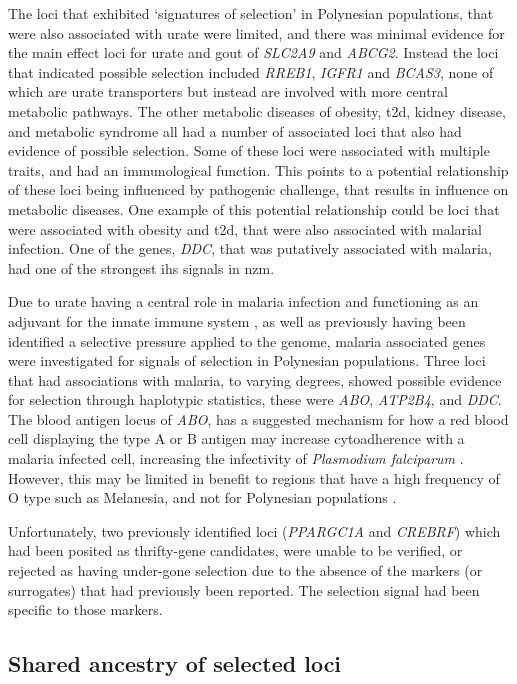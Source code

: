 \documentclass[twoside,openright]{report}
\begin{document}
The loci that exhibited `signatures of selection' in Polynesian
populations, that were also associated with urate were limited, and
there was minimal evidence for the main effect loci for urate and gout
of \emph{SLC2A9} and \emph{ABCG2}. Instead the loci that indicated
possible selection included \emph{RREB1}, \emph{IGFR1} and \emph{BCAS3},
none of which are urate transporters but instead are involved with more
central metabolic pathways. The other metabolic diseases of obesity,
\gls{t2d}, kidney disease, and metabolic syndrome all had a number of
associated loci that also had evidence of possible selection. Some of
these loci were associated with multiple traits, and had an
immunological function. This points to a potential relationship of these
loci being influenced by pathogenic challenge, that results in influence
on metabolic diseases. One example of this potential relationship could
be loci that were associated with obesity and \gls{t2d}, that were also
associated with malarial infection. One of the genes, \emph{DDC}, that
was putatively associated with malaria, had one of the strongest
\gls{ihs} signals in \gls{nzm}.

Due to urate having a central role in malaria infection and functioning
as an adjuvant for the innate immune system \citep{Ames1981, Opitz2009},
as well as previously having been identified a selective pressure
applied to the genome, malaria associated genes were investigated for
signals of selection in Polynesian populations. Three loci that had
associations with malaria, to varying degrees, showed possible evidence
for selection through haplotypic statistics, these were \emph{ABO},
\emph{ATP2B4}, and \emph{DDC}. The blood antigen locus of \emph{ABO},
has a suggested mechanism for how a red blood cell displaying the type A
or B antigen may increase cytoadherence with a malaria infected cell,
increasing the infectivity of \emph{Plasmodium falciparum}
\citep{Cserti2015}. However, this may be limited in benefit to regions
that have a high frequency of O type such as Melanesia, and not for
Polynesian populations \citep{Simmons1962, Zerihun2011}.

Unfortunately, two previously identified loci (\emph{PPARGC1A} and
\emph{CREBRF}) which had been posited as thrifty-gene candidates, were
unable to be verified, or rejected as having under-gone selection due to
the absence of the markers (or surrogates) that had previously been
reported. The selection signal had been specific to those markers.

\subsection{Shared ancestry of selected
loci}\label{shared-ancestry-of-selected-loci}
\end{document}
